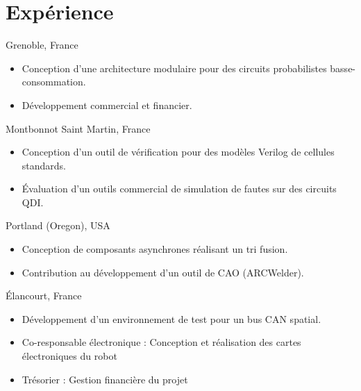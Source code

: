 \documentclass[11pt]{moderncv}
\begin{document}
\section{Expérience}
%
        {Grenoble, France}{}{%
          \begin{itemize}
          \item Conception d'une architecture modulaire pour des circuits probabilistes basse-consommation.
          \item Développement commercial et financier.
          \end{itemize}
        }
%
        {Montbonnot Saint Martin, France}{}{%
          \begin{itemize}
          \item Conception d'un outil de vérification pour des modèles
            Verilog de cellules standards.
          \item \'Evaluation d'un outils commercial de simulation de
            fautes sur des circuits QDI.
          \end{itemize}
        }
%
        {Portland (Oregon), USA}{}{%
          \begin{itemize}
          \item Conception de composants asynchrones réalisant un tri fusion.
          \item Contribution au développement d'un outil de CAO (ARCWelder).
          \end{itemize}
        }
%
        {Élancourt, France}{}{%
          \begin{itemize}
          \item Développement d'un environnement de test pour un bus CAN spatial.
          \end{itemize}
        }
%
        {}{}{%
          \begin{itemize}
          \item Co-responsable électronique : Conception et réalisation des cartes électroniques du robot
          \item Trésorier : Gestion financière du projet
          \end{itemize}
        }
\end{document}

